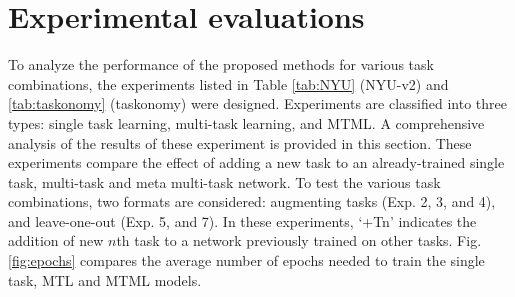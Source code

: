 \documentclass[conference]{IEEEtran}
\begin{document}
\section{Experimental evaluations}\label{sec:diss_of_results}
To analyze the performance of the proposed methods for various task combinations, the experiments listed in Table \ref{tab:NYU} (NYU-v2) and \ref{tab:taskonomy} (taskonomy) were designed.
Experiments are classified into three types: single task learning, multi-task learning, and \ac{MTML}. 
A comprehensive analysis of the results of these experiment is provided in this section.
These experiments compare the effect of adding a new task to an already-trained single task, multi-task and meta multi-task network.
To test the various task combinations, two formats are considered: augmenting tasks (Exp. 2, 3, and 4), and leave-one-out (Exp. 5, and 7).
In these experiments, `+Tn' indicates the addition of new $n$th task to a network previously trained on other tasks.
Fig. \ref{fig:epochs} compares the average number of epochs needed to train the single task, \ac{MTL} and \ac{MTML} models.
\end{document}

